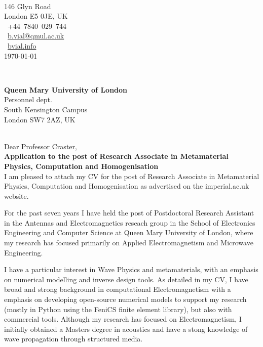 \documentclass{academia}
\begin{document}
\hfill%
\begin{minipage}[t]{.5\textwidth}
\\
146 Glyn Road\\
London E5 0JE, UK\\
~+44~7840~029~744\\
~\href{mailto:b.vial@qmul.ac.uk}{b.vial@qmul.ac.uk}\\
~\href{www.bvial.info}{bvial.info}
\\[2em]
\today
\end{minipage}\\[1em]
\begin{minipage}[t]{.5\textwidth}
    \begin{flushleft}
        \textbf{Queen Mary University of London}\\
Personnel dept.\\
South Kensington Campus\\
London SW7 2AZ, UK\\
    \end{flushleft}
\end{minipage}
\hfill %
\\[2em]


Dear Professor Craster,\\[1em]


\textbf{Application to the post of Research Associate in Metamaterial Physics, Computation and Homogenisation}\\[1.em]


I am pleased to attach my CV for the post of
Research Associate in Metamaterial Physics, Computation and Homogenisation 
as advertised on the imperial.ac.uk website.

For the past seven years I have held the post of Postdoctoral Research
Assistant in the Antennas and Electromagnetics reseach group in
the School of Electronics Engineering and Computer Science
at Queen Mary University of London, where my research
has focused primarily on Applied Electromagnetism and Microwave Engineering.

I have a particular interest in Wave Physics and metamaterials, with an emphasis on numerical
modelling and inverse design tools. As detailed in my CV, I have 
broad and strong background in computational Electromagnetism 
with a emphasis on developing open-source numerical models 
to support my research (mostly in Python using the FeniCS finite element library), 
but also with commercial tools. Although my research has focused on Electromagnetism, 
I initially obtained a Masters degree in acoustics and have a stong 
knowledge of wave propagation through structured media. 
\end{document}
